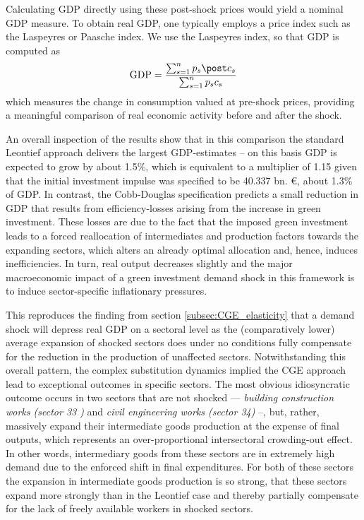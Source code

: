 Calculating GDP directly using these post-shock prices would yield a nominal GDP measure. To obtain real GDP, one typically employs a price index such as the Laspeyres or Paasche index. We use the Laspeyres index, so that GDP is computed as
$$
\text{GDP} = \frac{\sum_{s=1}^n p_s \post c_s}{\sum_{s=1}^n p_s  c_s}
$$
which measures the change in consumption valued at pre-shock prices, providing a meaningful comparison of real economic activity before and after the shock.


An overall inspection of the results show that in this comparison the standard Leontief approach delivers the largest GDP-estimates -- on this basis GDP is expected to grow by about 1.5\%, which is equivalent to a multiplier of 1.15 given that the initial investment impulse was specified to be 40.337 bn. €, about 1.3\% of GDP. In contrast, the Cobb-Douglas specification predicts a small reduction in GDP that results from efficiency-losses arising from the increase in green investment. These losses are due to the fact that the imposed green investment leads to a forced reallocation of intermediates and production factors towards the expanding sectors, which alters an already optimal allocation and, hence, induces inefficiencies. In turn, real output decreases slightly and the major macroeconomic impact of a green investment demand shock in this framework is to induce sector-specific inflationary pressures.


This reproduces the finding from section \ref{subsec:CGE_elasticity} that a demand shock will depress real GDP on a sectoral level as the (comparatively lower) average expansion of shocked sectors does under no conditions fully compensate for the reduction in the production of unaffected sectors. Notwithstanding this overall pattern, the complex substitution dynamics implied the CGE approach lead to exceptional outcomes in specific sectors. The most obvious idiosyncratic outcome occurs in two sectors that are not shocked –– \textit{building construction works (sector 33 )} and \textit{civil engineering works (sector 34)} --, but, rather, massively expand their intermediate goods production at the expense of final outputs, which represents an over-proportional intersectoral crowding-out effect. In other words, intermediary goods from these sectors are in extremely high demand due to the enforced shift in final expenditures. For both of these sectors the expansion in intermediate goods production is so strong, that these sectors expand more strongly than in the Leontief case and thereby partially compensate for the lack of freely available workers in shocked sectors.

